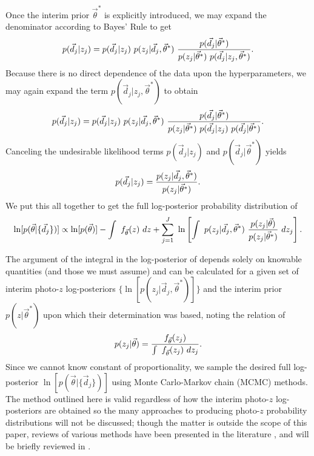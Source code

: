 Once the interim prior $\vec{\theta}^{*}$ is explicitly introduced, we may expand the denominator according to Bayes' Rule to get 
\begin{equation}
\eqlabel{eq:expand}
p(\vec{d}_{j}|z_{j}) = p(\vec{d}_{j}|z_{j})\ p(z_{j}|\vec{d}_{j},\vec{\theta}^{*})\ \frac{p(\vec{d}_{j}|\vec{\theta}^{*})}{p(z_{j}|\vec{\theta}^{*})\ p(\vec{d}_{j}|z_{j},\vec{\theta}^{*})}.
\end{equation}
Because there is no direct dependence of the data upon the hyperparameters, we may again expand the term $p(\vec{d}_{j}|z_{j},\vec{\theta}^{*})$ to obtain 
\begin{equation}
\eqlabel{eq:indterm}
p(\vec{d}_{j}|z_{j}) = p(\vec{d}_{j}|z_{j})\ p(z_{j}|\vec{d}_{j},\vec{\theta}^{*})\ \frac{p(\vec{d}_{j}|\vec{\theta}^{*})}{p(z_{j}|\vec{\theta}^{*})\ p(\vec{d}_{j}|z_{j})\ p(\vec{d}_{j}|\vec{\theta}^{*})}.
\end{equation}
Canceling the undesirable likelihood terms $p(\vec{d}_{j}|z_{j})$ and $p(\vec{d}_{j}|\vec{\theta}^{*})$ yields
\begin{equation}
\eqlabel{eq:cancel}
p(\vec{d}_{j}|z_{j}) = \frac{p(z_{j}|\vec{d}_{j},\vec{\theta}^{*})}{p(z_{j}|\vec{\theta}^{*})}.
\end{equation}
We put this all together to get the full log-posterior probability distribution of 
\begin{equation}
\eqlabel{eq:final}
\ln[p(\vec{\theta}|\{\vec{d}_{j}\})] \propto \ln[p(\vec{\theta})]-\int\ f_{\vec{\theta}}(z)\ dz + \sum_{j=1}^{J}\ \ln\left[\int\ p(z_{j}|\vec{d}_{j},\vec{\theta}^{*})\ \frac{p(z_{j}|\vec{\theta})}{p(z_{j}|\vec{\theta}^{*})}\ dz_{j}\right].
\end{equation}

The argument of the integral in the log-posterior of  depends solely on knowable quantities (and those we must assume) and can be calculated for a given set of interim photo-$z$ log-posteriors $\{\ln[p(z_{j}|\vec{d}_{j},\vec{\theta}^{*})]\}$ and the interim prior $p(z|\vec{\theta}^{*})$ upon which their determination was based, noting the relation of 
\begin{equation}
\eqlabel{eq:params}
p(z_{j}|\vec{\theta}) = \frac{f_{\vec{\theta}}(z_{j})}{\int\ f_{\vec{\theta}}(z_{j})\ dz_{j}}.
\end{equation}
Since we cannot know constant of proportionality, we sample the desired full log-posterior $\ln[p(\vec{\theta}|\{\vec{d}_{j}\})]$ using Monte Carlo-Markov chain (MCMC) methods.  
The method outlined here is valid regardless of how the interim photo-$z$ log-posteriors are obtained so the many approaches to producing photo-$z$ probability distributions will not be discussed; though the matter is outside the scope of this paper, reviews of various methods have been presented in the literature \citep{Sheldon2012, Ball2008, CarrascoKind2013, CarrascoKind2014a}, and will be briefly reviewed in .

